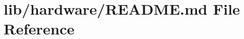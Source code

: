 \hypertarget{lib_2hardware_2README_8md}{}\section{lib/hardware/\+R\+E\+A\+D\+ME.md File Reference}
\label{lib_2hardware_2README_8md}
